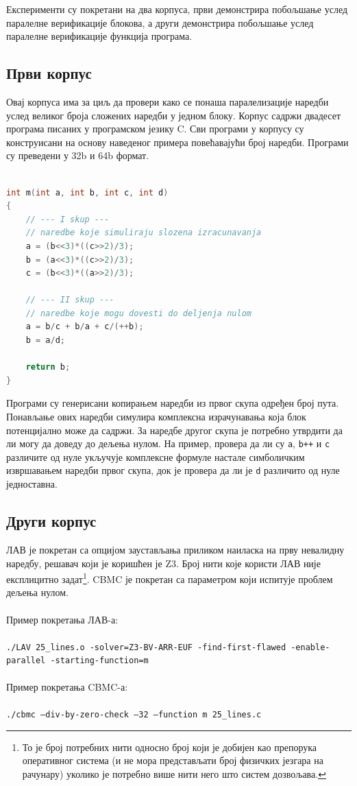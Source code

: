 \documentclass[12pt,oneside]{memoir}
\begin{document}
  Експерименти су покретани на два корпуса, први демонстрира побољшање услед паралелне верификације блокова, а други демонстрира побољшање услед паралелне верификације функција програма.
  \subsection{Први корпус}
  
 Овај корпуса има за циљ да провери како се понаша паралелизације наредби услед великог броја сложених наредби у једном блоку. Корпус садржи двадесет програма писаних у програмском језику C. Сви програми у корпусу су конструисани на основу наведеног примера повећавајући број наредби. Програми су преведени у 32b и 64b формат. \newpage

  
\begin{lstlisting}[language=C,frame=single,caption=Пример програма,label=primer1]

int m(int a, int b, int c, int d)
{
	// --- I skup ---
	// naredbe koje simuliraju slozena izracunavanja
	a = (b<<3)*((c>>2)/3);
	b = (a<<3)*((c>>2)/3);
	c = (b<<3)*((a>>2)/3);

	// --- II skup --- 
	// naredbe koje mogu dovesti do deljenja nulom
	a = b/c + b/a + c/(++b);
	b = a/d;
	
	return b;
}
\end{lstlisting}
 Програми су генерисани копирањем наредби из првог скупа одређен број пута. Понављање ових наредби симулира комплексна израчунавања која блок потенцијално може да садржи. За наредбе другог скупа је потребно утврдити да ли могу да доведу до дељења нулом. На пример, провера да ли су \texttt{a}, \texttt{b++} и \texttt{c} различите од нуле укључује комплексне формуле настале симболичким извршавањем наредби првог скупа, док је провера да ли је \texttt{d} различито од нуле једноставна.    
  \subsection{Други корпус}

  
ЛАВ је покретан са опцијом заустављања приликом наиласка на прву невалидну наредбу, решавач који је коришћен је Z3. Број нити које користи ЛАВ није експлицитно задат\footnote{То је број потребних нити односно број који је добијен као препорука оперативног система (и не мора представљати број физичких језгара на рачунару) уколико је потребно више нити него што систем дозвољава.}. CBMC је покретан са параметром који испитује проблем дељења нулом.
\\
\\
Пример покретања ЛАВ-а:
\\ \\
\texttt{./LAV 25\_lines.o -solver=Z3-BV-ARR-EUF -find-first-flawed -enable-parallel -starting-function=m}
\\
\\
Пример покретања CBMC-а:
\\ \\
\texttt{./cbmc --div-by-zero-check --32 --function m 25\_lines.c}
\end{document}
